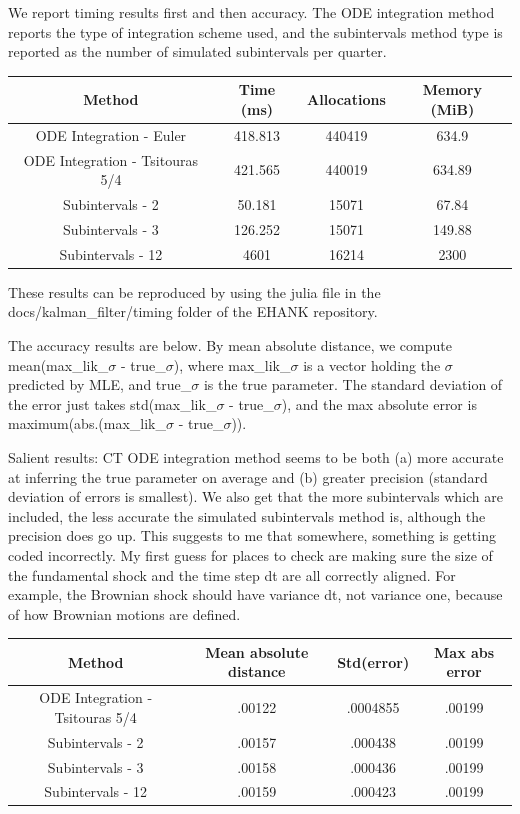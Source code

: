 \documentclass[12 pt, oneside]{article}
\theoremstyle{definition}
\theoremstyle{definition}
\theoremstyle{definition}
\newcommand{\fd}{\vspace{2.5mm}}
\begin{document}
We report timing results first and then accuracy. The ODE integration method reports the type of integration scheme used, and the subintervals method type is reported as the number of simulated subintervals per quarter.
\begin{center}
  \begin{tabular}{|c|c|c|c|}
    \hline
    Method & Time (ms) & Allocations & Memory (MiB)\\
\hline
    ODE Integration - Euler & 418.813  & 440419 & 634.9 \\
    ODE Integration - Tsitouras 5/4 & 421.565 & 440019  & 634.89\\
    Subintervals - 2  & 50.181 & 15071 & 67.84 \\
    Subintervals - 3  & 126.252 & 15071 & 149.88\\
    Subintervals - 12 & 4601 & 16214 & 2300\\
\hline
  \end{tabular}
\end{center}
These results can be reproduced by using the julia file in the docs/kalman\_filter/timing folder of the EHANK repository.

The accuracy results are below. By mean absolute distance, we compute mean(max\_lik\_$\sigma$ - true\_$\sigma$), where max\_lik\_$\sigma$ is a vector holding the $\sigma$ predicted by MLE, and true\_$\sigma$ is the true parameter. The standard deviation of the error just takes std(max\_lik\_$\sigma$ - true\_$\sigma$), and the max absolute error is maximum(abs.(max\_lik\_$\sigma$ - true\_$\sigma$)).


\fd

Salient results: CT ODE integration method seems to be both (a) more accurate at inferring the true parameter on average and (b) greater precision (standard deviation of errors is smallest). We also get that the more subintervals which are included, the less accurate the simulated subintervals method is, although the precision does go up. This suggests to me that somewhere, something is getting coded incorrectly. My first guess for places to check are making sure the size of the fundamental shock and the time step dt are all correctly aligned. For example, the Brownian shock should have variance dt, not variance one, because of how Brownian motions are defined.


\begin{center}
\begin{tabular}{|c|c|c|c|}
\hline
Method &  Mean absolute distance & Std(error) & Max abs error\\
\hline
ODE Integration - Tsitouras 5/4 & .00122 & .0004855 & .00199\\
Subintervals - 2 &.00157 & .000438 & .00199\\
Subintervals - 3 & .00158 & .000436 & .00199\\
Subintervals - 12 & .00159 & .000423 & .00199\\
\hline
\end{tabular}
\end{center}
\end{document}
